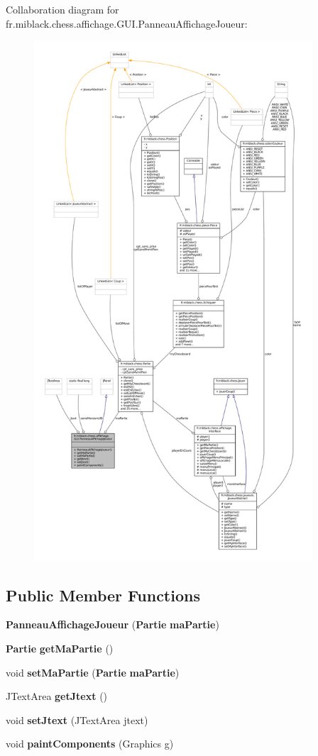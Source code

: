 Collaboration diagram for fr.\-miblack.\-chess.\-affichage.\-G\-U\-I.\-Panneau\-Affichage\-Joueur\-:
\nopagebreak
\begin{figure}[H]
\begin{center}
\leavevmode
\includegraphics[height=550pt]{classfr_1_1miblack_1_1chess_1_1affichage_1_1GUI_1_1PanneauAffichageJoueur__coll__graph}
\end{center}
\end{figure}
\subsection*{Public Member Functions}
\begin{DoxyCompactItemize}
\item 
{\bf Panneau\-Affichage\-Joueur} ({\bf Partie} {\bf ma\-Partie})
\item 
{\bf Partie} {\bf get\-Ma\-Partie} ()
\item 
void {\bf set\-Ma\-Partie} ({\bf Partie} {\bf ma\-Partie})
\item 
J\-Text\-Area {\bf get\-Jtext} ()
\item 
void {\bf set\-Jtext} (J\-Text\-Area jtext)
\item 
void {\bf paint\-Components} (Graphics g)
\end{DoxyCompactItemize}
